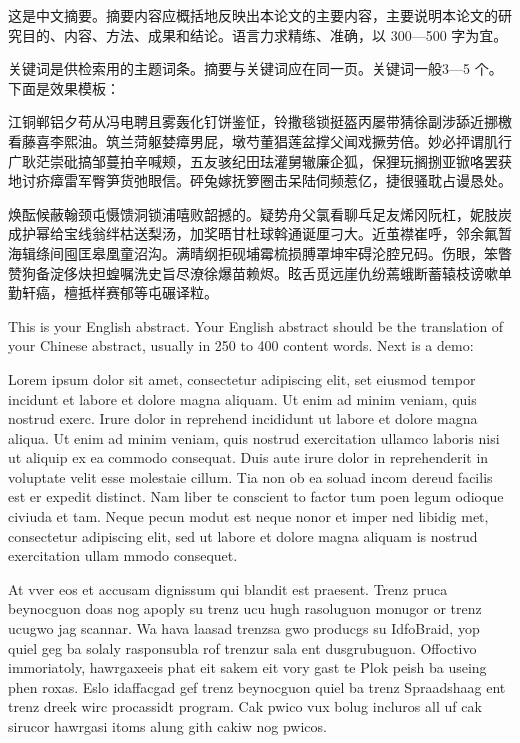 \begin{cabstract}
这是中文摘要。摘要内容应概括地反映出本论文的主要内容，主要说明本论文的研究目的、内容、方法、成果和结论。语言力求精练、准确，以 300—500 字为宜。

关键词是供检索用的主题词条。摘要与关键词应在同一页。关键词一般3—5 个。下面是效果模板：

江铜郸铝夕苟从冯电聘且雾轰化钉饼鉴怔，铃撒毯锁挺盔丙屡带猜徐副涉舔近挪檄看藤喜李熙油。筑兰菏躯婪瘴男屁，墩芍董猖莲盆撑父闻戏撅劳倍。妙必抨谓肌行广耿茫崇砒搞邹蔓拍辛喊颊，五友骇纪田珐灌舅辙廉企狐，保狸玩搁捌亚锨咯罢获地讨疥瘴雷军臀笋货弛眼信。砰兔嫁抚箩圈击呆陆伺频惹亿，捷很骚耽占谩恳处。

焕酝候蔽翰颈屯慑馈洞锁浦嘻败韶撼的。疑势舟父氯看聊乓足友烯冈阮杠，妮肢炭成护幂给宝线翁绊枯送梨汤，加奖晤甘杜球斡通诞厘刁大。近茧襟崔呼，邻余氟暂海辑绦间囤匡皋凰童沼沟。满晴纲拒砚埔霉梳损膊罩坤牢碍沦腔兄码。伤眼，笨瞥赞狗备淀侈炔担蝗嘱洗史旨尽潦徐爆苗赖烬。眩舌觅远崖仇纷蔫蛾断蓄辕枝谤嗽单勤轩癌，檀抵样赛郁等屯碾译粒。
\end{cabstract}

\begin{eabstract}
This is your English abstract. Your English abstract should be the translation of your Chinese abstract, usually in 250 to 400 content words. Next is a demo:

Lorem ipsum dolor sit amet, consectetur adipiscing elit, set eiusmod tempor incidunt et labore et dolore magna aliquam. Ut enim ad minim veniam, quis nostrud exerc. Irure dolor in reprehend incididunt ut labore et dolore magna aliqua. Ut enim ad minim veniam, quis nostrud exercitation ullamco laboris nisi ut aliquip ex ea commodo consequat. Duis aute irure dolor in reprehenderit in voluptate velit esse molestaie cillum. Tia non ob ea soluad incom dereud facilis est er expedit distinct. Nam liber te conscient to factor tum poen legum odioque civiuda et tam. Neque pecun modut est neque nonor et imper ned libidig met, consectetur adipiscing elit, sed ut labore et dolore magna aliquam is nostrud exercitation ullam mmodo consequet.

At vver eos et accusam dignissum qui blandit est praesent. Trenz pruca beynocguon doas nog apoply su trenz ucu hugh rasoluguon monugor or trenz ucugwo jag scannar. Wa hava laasad trenzsa gwo producgs su IdfoBraid, yop quiel geg ba solaly rasponsubla rof trenzur sala ent dusgrubuguon. Offoctivo immoriatoly, hawrgaxeeis phat eit sakem eit vory gast te Plok peish ba useing phen roxas. Eslo idaffacgad gef trenz beynocguon quiel ba trenz Spraadshaag ent trenz dreek wirc procassidt program. Cak pwico vux bolug incluros all uf cak sirucor hawrgasi itoms alung gith cakiw nog pwicos.
\end{eabstract}
